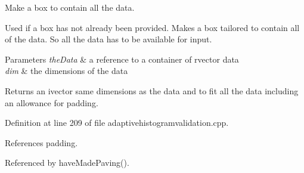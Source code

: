 \-Make a box to contain all the data. 

\-Used if a box has not already been provided. \-Makes a box tailored to contain all of the data. \-So all the data has to be available for input.


\begin{DoxyParams}{\-Parameters}
{\em the\-Data} & a reference to a container of rvector data \\
\hline
{\em dim} & the dimensions of the data \\
\hline
\end{DoxyParams}
\begin{DoxyReturn}{\-Returns}
an ivector same dimensions as the data and to fit all the data including an allowance for padding. 
\end{DoxyReturn}


\-Definition at line 209 of file adaptivehistogramvalidation.\-cpp.



\-References padding.



\-Referenced by have\-Made\-Paving().



